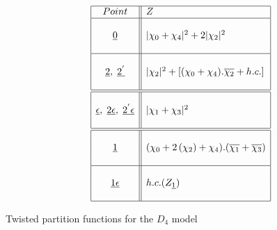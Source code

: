 \documentclass[a4paper,11pt]{article}
\newcommand{\ch}[1]{\chi_{#1}}
\newcommand{\och}[1]{\overline{\chi_{#1}}}
\newcommand{\ud}[1]{\underline{#1}}
\newcommand{\ep}{\epsilon}
\newcommand{\xa}[1]{|\chi_{#1}|^2}
\newcommand{\xaa}[2]{|\chi_{#1} + \chi_{#2}|^2}
\begin{document}

\begin{table}
\scriptsize
$$
\begin{array}{|c||l|}
\hline
Point & Z \\
\hline
{}   & {} \\
\ud0 & \xaa{0}{4} + 2\xa{2} \\
{}   & {} \\
\hline
{}   & {} \\
\ud2, \; \ud{2^{'}} & \xa{2} + [(\ch{0} + \ch{4}).\och{2} + h.c.] \\
{}   & {} \\
\hline
\hline
{}   & {} \\
\ud{\ep}, \; \ud{2\ep}, \; \ud{2^{'}\ep} & \xaa{1}{3} \\
{}   & {} \\
\hline
\hline
{}   & {} \\
\ud1 & (\ch{0} + 2\, (\ch{2}) + \ch{4}).(\och{1} + \och{3}) \\
{}   & {} \\
\hline
{}   & {} \\
\ud{1\ep} & h.c. (Z_{\ud1}) \\
{}   & {} \\
\hline
\end{array}
$$
\normalsize
\caption{Twisted partition functions for the $D_4$ model}
\end{table}



\end{document}
